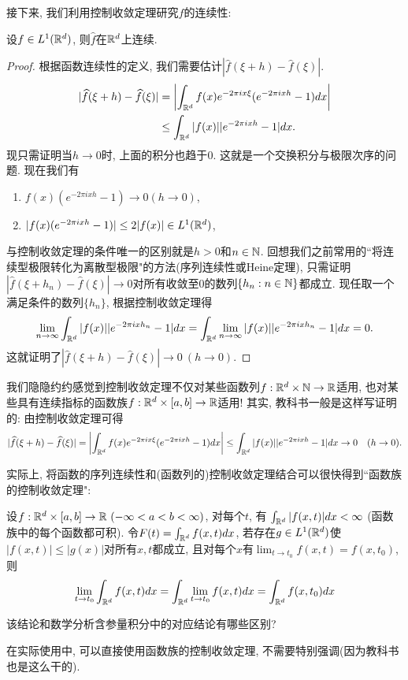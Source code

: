 接下来, 我们利用控制收敛定理研究$\hat{f}$的连续性:
\begin{example}[~($\hat{f} \in C(\R^d)$)]
    设$f \in L^1(\mathbb{R}^d)$, 则$\hat{f}$在$\mathbb{R}^d$上连续.
\end{example}
\begin{proof}
    根据函数连续性的定义, 我们需要估计$|\hat{f}(\xi+h) - \hat{f}(\xi)|$.
    \begin{align*}
    |\widehat{f}(\xi+h)-\widehat{f}(\xi)|
    &= \left|\int_{\mathbb{R}^d} f(x)e^{-2\pi ix \xi}(e^{-2\pi ixh}-1) dx \right|  \\
    &\leq \int_{\mathbb{R}^d} |f(x)||e^{-2\pi ixh}-1| dx.
    \end{align*}
    现只需证明当$h \to 0$时, 上面的积分也趋于$0$. 这就是一个交换积分与极限次序的问题.
    现在我们有
    \begin{enumerate}
        \item $f(x)(e^{-2\pi ixh}-1) \to 0 (h \to 0)$,
        \item $|f(x)(e^{-2\pi ixh}-1)| \leq 2|f(x)| \in L^1(\mathbb{R}^d)$,
    \end{enumerate}
    与控制收敛定理的条件唯一的区别就是$h>0$和$n \in \mathbb{N}$. 回想我们之前常用的``将连续型极限转化为离散型极限"的方法(序列连续性或Heine定理), 只需证明$|\hat{f}(\xi+h_n)-\hat{f}(\xi)| \to 0$对所有收敛至$0$的数列$\{h_n: n \in \mathbb{N}\}$都成立. 现任取一个满足条件的数列$\{h_n\}$, 根据控制收敛定理得
    $$\lim_{n \to \infty}\int_{\mathbb{R}^d} |f(x)||e^{-2\pi i xh_n}-1| dx
    = \int_{\mathbb{R}^d} \lim_{n \to \infty}|f(x)||e^{-2\pi i xh_n}-1| dx = 0. $$
    这就证明了$|\hat{f}(\xi+h) - \hat{f}(\xi)| \to 0 ~(h \to 0)$.
\end{proof}
\begin{remark}
    我们隐隐约约感觉到控制收敛定理不仅对某些函数列$f: \mathbb{R}^d \times \mathbb{N} \to \mathbb{R}$适用, 也对某些具有连续指标的函数族$f: \mathbb{R}^d \times [a, b] \to \mathbb{R}$适用! 其实, 教科书一般是这样写证明的:
    由控制收敛定理可得
    $$|\widehat{f}(\xi+h)-\widehat{f}(\xi)|
    = \left|\int_{\mathbb{R}^d} f(x)e^{-2\pi ix \xi}(e^{-2\pi ixh}-1) dx \right|  
    \leq \int_{\mathbb{R}^d} |f(x)||e^{-2\pi ixh}-1| dx \to 0 \quad (h \to 0).$$
\end{remark}
实际上, 将函数的序列连续性和(函数列的)控制收敛定理结合可以很快得到``函数族的控制收敛定理":
\begin{exercise} \label{switch_lim_int}
    设$f:\mathbb{R}^d \times [a,b] \to \mathbb{R} ~(-\infty<a<b<\infty)$, 对每个$t$, 有
    $\int_{\mathbb{R}^d} |f(x,t)|dx < \infty~$(函数族中的每个函数都可积). 令$F(t)=\int_{\mathbb{R}^d} f(x,t)dx$,
    若存在$g \in L^1(\mathbb{R}^d)$使$|f(x,t)| \leq |g(x)|$对所有$x,t$都成立, 且对每个$x$有$\lim_{t\to t_0}f(x,t)=f(x,t_0)$, 则
    $$\lim_{t\to t_0} \int_{\mathbb{R}^d} f(x,t)dx = \int_{\mathbb{R}^d} \lim_{t\to t_0} f(x,t)dx = \int_{\mathbb{R}^d} f(x,t_0)dx$$
\end{exercise}
\begin{problem}
    该结论和数学分析含参量积分中的对应结论有哪些区别? 
\end{problem}
在实际使用中, 可以直接使用函数族的控制收敛定理, 不需要特别强调(因为教科书也是这么干的). 
